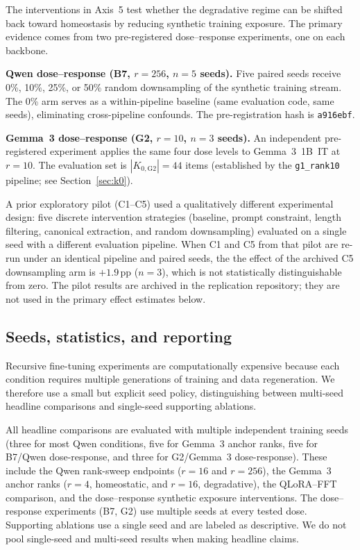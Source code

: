 \documentclass[a4paper,fleqn]{cas-dc}
\newif\ifshowchanges
\newcommand{\rev}[1]{\ifshowchanges{\color{blue}#1}\else{#1}\fi}
\begin{document}
\rev{The interventions in Axis~5 test whether the degradative regime can be shifted
back toward homeostasis by reducing synthetic training exposure. The primary
evidence comes from two pre-registered dose--response experiments, one on each
backbone.

\textbf{Qwen dose--response (B7, $r=256$, $n=5$ seeds).}
Five paired seeds receive 0\%, 10\%, 25\%, or 50\% random downsampling of the
synthetic training stream. The 0\% arm serves as a within-pipeline baseline
(same evaluation code, same seeds), eliminating cross-pipeline confounds. The
pre-registration hash is \texttt{a916ebf}.

\textbf{Gemma~3 dose--response (G2, $r=10$, $n=3$ seeds).}
An independent pre-registered experiment applies the same four dose levels to
Gemma~3~1B~IT at $r=10$. The evaluation set is $|K_{0,\mathrm{G2}}|=44$ items
(established by the \texttt{g1\_rank10} pipeline; see Section~\ref{sec:k0}).

}
\rev{A prior exploratory pilot (C1--C5) used a qualitatively different
experimental design: five discrete intervention strategies (baseline, prompt
constraint, length filtering, canonical extraction, and random downsampling)
evaluated on a single seed with a different evaluation pipeline. When C1 and C5
from that pilot are re-run under an identical pipeline and paired seeds, the
the effect of the archived C5 downsampling arm is $+1.9$\,pp ($n=3$), which is not
statistically distinguishable from zero. The pilot results are archived in the
replication repository; they are not used in the primary effect estimates below.}

\subsection{Seeds, statistics, and reporting}\label{sec:statistics}

Recursive fine-tuning experiments are computationally expensive because each
condition requires multiple generations of training and data regeneration. We
therefore use a small but explicit seed policy, distinguishing between
multi-seed headline comparisons and single-seed supporting ablations.

All headline comparisons are evaluated with multiple independent training seeds
\rev{(three for most Qwen conditions, five for Gemma~3 anchor ranks, five for B7/Qwen dose-response, and three for G2/Gemma~3 dose-response)}. These
include the Qwen rank-sweep endpoints ($r=16$ and $r=256$), the Gemma~3 anchor
\rev{ranks ($r=4$, homeostatic, and $r=16$, degradative), the QLoRA--FFT comparison, and the dose--response synthetic}
exposure interventions. \rev{The dose--response experiments (B7, G2) use multiple seeds at
every tested dose. Supporting ablations use a single seed and are
labeled as descriptive.} We do not pool
single-seed and multi-seed results when making headline claims.
\end{document}
